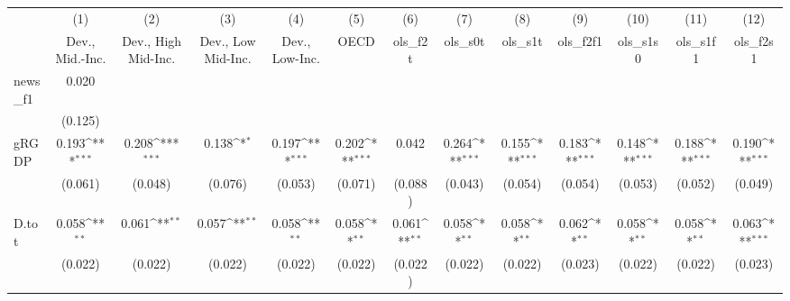 {
\def\sym#1{\ifmmode^{#1}\else\(^{#1}\)\fi}
\begin{tabular}{l*{12}{c}}
\toprule
            &\multicolumn{1}{c}{(1)}&\multicolumn{1}{c}{(2)}&\multicolumn{1}{c}{(3)}&\multicolumn{1}{c}{(4)}&\multicolumn{1}{c}{(5)}&\multicolumn{1}{c}{(6)}&\multicolumn{1}{c}{(7)}&\multicolumn{1}{c}{(8)}&\multicolumn{1}{c}{(9)}&\multicolumn{1}{c}{(10)}&\multicolumn{1}{c}{(11)}&\multicolumn{1}{c}{(12)}\\
            &\multicolumn{1}{c}{Dev., Mid.-Inc.}&\multicolumn{1}{c}{Dev., High Mid-Inc.}&\multicolumn{1}{c}{Dev., Low Mid-Inc.}&\multicolumn{1}{c}{Dev., Low-Inc.}&\multicolumn{1}{c}{OECD}&\multicolumn{1}{c}{ols\_f2t}&\multicolumn{1}{c}{ols\_s0t}&\multicolumn{1}{c}{ols\_s1t}&\multicolumn{1}{c}{ols\_f2f1}&\multicolumn{1}{c}{ols\_s1s0}&\multicolumn{1}{c}{ols\_s1f1}&\multicolumn{1}{c}{ols\_f2s1}\\
\midrule
news\_f1     &       0.020         &                     &                     &                     &                     &                     &                     &                     &                     &                     &                     &                     \\
            &     (0.125)         &                     &                     &                     &                     &                     &                     &                     &                     &                     &                     &                     \\
\addlinespace
gRGDP       &       0.193\sym{***}&       0.208\sym{***}&       0.138\sym{*}  &       0.197\sym{***}&       0.202\sym{***}&       0.042         &       0.264\sym{***}&       0.155\sym{***}&       0.183\sym{***}&       0.148\sym{***}&       0.188\sym{***}&       0.190\sym{***}\\
            &     (0.061)         &     (0.048)         &     (0.076)         &     (0.053)         &     (0.071)         &     (0.088)         &     (0.043)         &     (0.054)         &     (0.054)         &     (0.053)         &     (0.052)         &     (0.049)         \\
\addlinespace
D.tot       &       0.058\sym{**} &       0.061\sym{**} &       0.057\sym{**} &       0.058\sym{**} &       0.058\sym{**} &       0.061\sym{**} &       0.058\sym{**} &       0.058\sym{**} &       0.062\sym{**} &       0.058\sym{**} &       0.058\sym{**} &       0.063\sym{***}\\
            &     (0.022)         &     (0.022)         &     (0.022)         &     (0.022)         &     (0.022)         &     (0.022)         &     (0.022)         &     (0.022)         &     (0.023)         &     (0.022)         &     (0.022)         &     (0.023)         \\

\end{tabular}}
